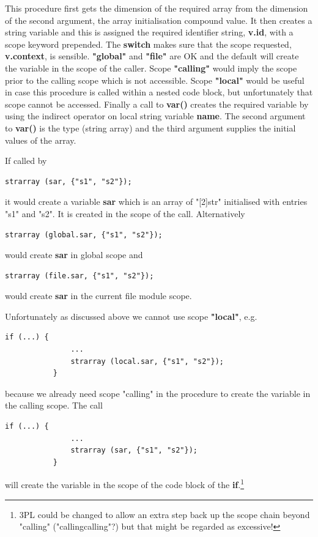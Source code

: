         This procedure first gets the dimension of the required array from the
        dimension of the second argument, the array initialisation compound
        value. It then creates a string variable and this is assigned the
        required identifier string, {\bf v.id}, with a scope keyword prepended.
        The {\bf switch} makes sure that the scope requested, {\bf v.context},
        is sensible. {\bf "global"} and {\bf "file"} are OK and the default will
        create the variable in the scope of the caller. Scope {\bf "calling"}
        would imply the scope prior to the calling scope which is not
        accessible. Scope {\bf "local"} would be useful in case this procedure
        is called within a nested code block, but unfortunately that scope
        cannot be accessed. Finally a call to {\bf var()} creates the required
        variable by using the indirect operator on local string variable {\bf
        name}. The second argument to {\bf var()} is the type (string array) and
        the third argument supplies the initial values of the array.
        
        If called by 
        \begin{lstlisting}[gobble=8, language=threepl]
           strarray (sar, {"s1", "s2"});
        \end{lstlisting}
        it would create a variable {\bf sar} which is an array of
        "[2]str" initialised with entries "s1" and "s2". It is created
        in the scope of the call. Alternatively
        \begin{lstlisting}[gobble=8, language=threepl]
           strarray (global.sar, {"s1", "s2"});
        \end{lstlisting}
        would create {\bf sar} in global scope and
        \begin{lstlisting}[gobble=8, language=threepl]
           strarray (file.sar, {"s1", "s2"});
        \end{lstlisting}
        would create {\bf sar} in the current file module scope.
        
        Unfortunately as discussed above we cannot use scope {\bf "local"},
        e.g.
        \begin{lstlisting}[gobble=8, language=threepl]
           if (...) {
               ...
               strarray (local.sar, {"s1", "s2"});
           }
        \end{lstlisting}
        because we already need scope "calling" in the procedure to
        create the variable in the calling scope. The call
        \begin{lstlisting}[gobble=8, language=threepl]
           if (...) {
               ...
               strarray (sar, {"s1", "s2"});
           }
        \end{lstlisting}
        will create the variable in the scope of the code block of the
        {\bf if}.\footnote{3PL could be changed to allow an extra step back up
        the scope chain beyond "calling" ("callingcalling"?) but that might be
        regarded as excessive!}


